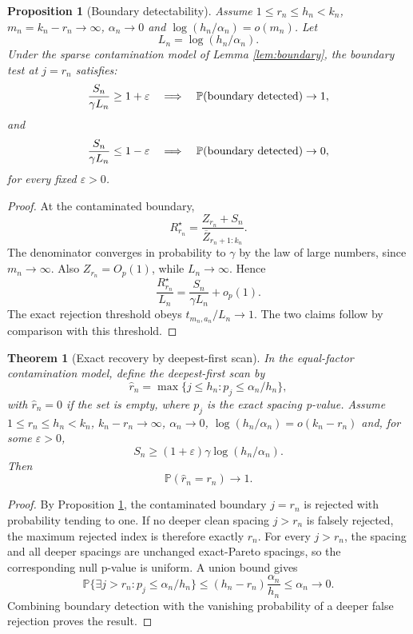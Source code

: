 \documentclass[11pt]{article}
\newtheorem{theorem}{Theorem}
\newtheorem{proposition}{Proposition}
\newcommand{\Pp}{\mathbb{P}}
\begin{document}
\begin{proposition}[Boundary detectability]
\label{prop:detectability}
Assume $1\le r_n\le h_n<k_n$, $m_n=k_n-r_n\to\infty$,
$\alpha_n\to0$ and $\log(h_n/\alpha_n)=o(m_n)$.  Let
\[
  L_n=\log(h_n/\alpha_n).
\]
Under the sparse contamination model of Lemma \ref{lem:boundary}, the boundary
test at $j=r_n$ satisfies:
\[
  \frac{S_n}{\gamma L_n}\ge 1+\varepsilon
  \quad\Longrightarrow\quad
  \Pp(\hbox{boundary detected})\to1,
\]
and
\[
  \frac{S_n}{\gamma L_n}\le 1-\varepsilon
  \quad\Longrightarrow\quad
  \Pp(\hbox{boundary detected})\to0,
\]
for every fixed $\varepsilon>0$.
\end{proposition}

\begin{proof}
At the contaminated boundary,
\[
  R^\star_{r_n}
  =
  \frac{Z_{r_n}+S_n}{\overline Z_{r_n+1:k_n}}.
\]
The denominator converges in probability to $\gamma$ by the law of large
numbers, since $m_n\to\infty$.  Also $Z_{r_n}=O_p(1)$, while
$L_n\to\infty$.  Hence
\[
  \frac{R^\star_{r_n}}{L_n}
  =
  \frac{S_n}{\gamma L_n}+o_p(1).
\]
The exact rejection threshold obeys $t_{m_n,a_n}/L_n\to1$.  The two claims
follow by comparison with this threshold.
\end{proof}

\begin{theorem}[Exact recovery by deepest-first scan]
\label{thm:exact-recovery}
In the equal-factor contamination model, define the deepest-first scan by
\[
  \widehat r_n
  =
  \max\{j\le h_n:p_j\le\alpha_n/h_n\},
\]
with $\widehat r_n=0$ if the set is empty, where $p_j$ is the exact spacing
p-value.  Assume $1\le r_n\le h_n<k_n$, $k_n-r_n\to\infty$,
$\alpha_n\to0$, $\log(h_n/\alpha_n)=o(k_n-r_n)$ and, for some
$\varepsilon>0$,
\[
  S_n\ge(1+\varepsilon)\gamma\log(h_n/\alpha_n).
\]
Then
\[
  \Pp(\widehat r_n=r_n)\to1.
\]
\end{theorem}

\begin{proof}
By Proposition \ref{prop:detectability}, the contaminated boundary $j=r_n$ is
rejected with probability tending to one.  If no deeper clean spacing
$j>r_n$ is falsely rejected, the maximum rejected index is therefore exactly
$r_n$.  For every $j>r_n$, the spacing and all deeper spacings are unchanged
exact-Pareto spacings, so the corresponding null p-value is uniform.  A union
bound gives
\[
  \Pp\{\exists j>r_n:p_j\le\alpha_n/h_n\}
  \le
  (h_n-r_n)\frac{\alpha_n}{h_n}
  \le
  \alpha_n
  \to0.
\]
Combining boundary detection with the vanishing probability of a deeper false
rejection proves the result.
\end{proof}
\end{document}

